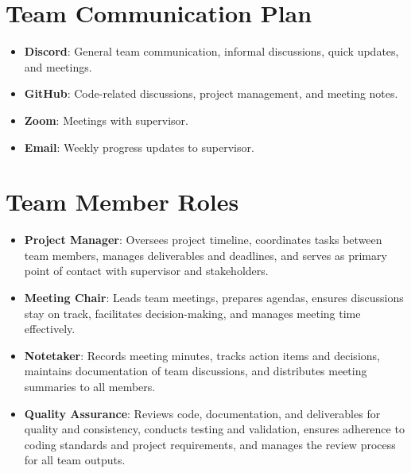 \documentclass{article}
\begin{document}




\section{Team Communication Plan}

\begin{itemize}
  \item \textbf{Discord}: General team communication, informal discussions, quick updates, and meetings.
  \item \textbf{GitHub}: Code-related discussions, project management, and meeting notes.
  \item \textbf{Zoom}: Meetings with supervisor.
  \item \textbf{Email}: Weekly progress updates to supervisor.

\end{itemize}


\section{Team Member Roles}


\begin{itemize}
  \item \textbf{Project Manager}: Oversees project timeline, coordinates tasks between team members, manages deliverables and deadlines, and serves as primary point of contact with supervisor and stakeholders.
  \item \textbf{Meeting Chair}: Leads team meetings, prepares agendas, ensures discussions stay on track, facilitates decision-making, and manages meeting time effectively.
  \item \textbf{Notetaker}: Records meeting minutes, tracks action items and decisions, maintains documentation of team discussions, and distributes meeting summaries to all members.
  \item \textbf{Quality Assurance}: Reviews code, documentation, and deliverables for quality and consistency, conducts testing and validation, ensures adherence to coding standards and project requirements, and manages the review process for all team outputs.
\end{itemize}
\end{document}
